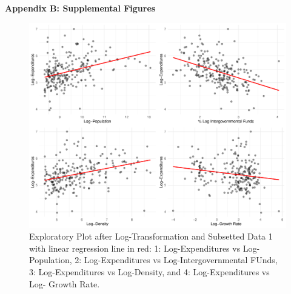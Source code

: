 \documentclass[11pt]{article}\usepackage[]{graphicx}\usepackage[]{color}
\makeatletter
\def\maxwidth{ %
  \ifdim\Gin@nat@width>\linewidth
    \linewidth
  \else
    \Gin@nat@width
  \fi
}
\makeatother
\begin{document}
\clearpage
\newpage
\noindent \Large{{\bf Appendix B: Supplemental Figures}}

\begin{figure}[h!] 
\begin{center}

\includegraphics[width=\maxwidth]{figure/unnamed-chunk-12-1} 

\caption{Exploratory Plot after Log-Transformation and Subsetted Data 1 with linear regression line in red: 1: Log-Expenditures vs Log-Population, 2: Log-Expenditures vs Log-Intergovernmental FUnds, 3: Log-Expenditures vs Log-Density, and 4: Log-Expenditures vs Log- Growth Rate.}
\label{sec2-explore}
\end{center} 
\end{figure}
\end{document}
